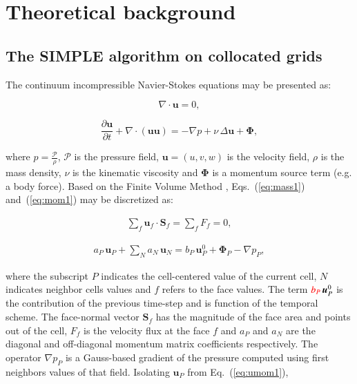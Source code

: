 \documentclass[final,3p,times,10pt,onecolumn]{myElsarticle}
\numberwithin{equation}{section}
\begin{document}
\section{Theoretical background} \label{sec:theory}

\subsection{The SIMPLE algorithm on collocated grids}

The continuum incompressible Navier-Stokes equations may be presented as:

\begin{equation}
\displaystyle \nabla \cdotp \boldsymbol{u} = 0, 
\label{eq:mass1}
\end{equation}

\begin{equation}
\displaystyle \frac{\partial \boldsymbol{u}}{\partial t} + \nabla \cdotp (\boldsymbol{u} \boldsymbol{u}) = -\nabla p + \nu\, \Delta \boldsymbol{u} + \boldsymbol{\Phi},
\label{eq:mom1}
\end{equation}

\noindent where $\displaystyle p = \frac{\mathcal{P}}{\rho}$, $\mathcal{P}$ is the pressure field, $\boldsymbol{u} = (u,v,w)$ is the velocity field, {\color{red}$\rho$ is the mass density, }$\nu$ is the kinematic viscosity and $\mathbf{\Phi}$ is a momentum source term (e.g. a body force).
Based on the Finite Volume Method \cite{jasak}, Eqs.~(\ref{eq:mass1}) and~(\ref{eq:mom1}) may be discretized as:

\begin{equation}
\begin{split}
\sum_{f} \boldsymbol{u}_{f} \cdotp \textbf{S}_{f} = \sum_{f} F_f = 0, 
\end{split}
\label{eq:mass2} 
\end{equation}

\begin{equation}
\begin{split}
a_P\,\boldsymbol{u}_P + \sum_{N} a_{N}\,\boldsymbol{u}_{N} = b_P\, \boldsymbol{u}^0_P + \boldsymbol{\Phi}_P - \nabla p_P,
\label{eq:umom1}
\end{split}
\end{equation}

\noindent where the subscript $P$ indicates the cell-centered value of the current cell, $N$ indicates neighbor cells values and $f$ refers to the face values. The term ${\color{red}b_P}\, \boldsymbol{u}^0_P$ is the contribution of the previous time-step and is function of the temporal scheme. {\color{red} The face-normal vector $\textbf{S}_{f}$ has the magnitude of the face area and points out of the cell}, $F_f$ is the {\color{red} velocity} flux at the face $f$ and $a_P$ and $a_{N}$ are the diagonal and off-diagonal momentum matrix coefficients respectively. The operator $\nabla p_P$ is a Gauss-based gradient of the pressure computed using first neighbors values of that field. Isolating $\boldsymbol{u}_P$ from Eq.~(\ref{eq:umom1}),
\end{document}
